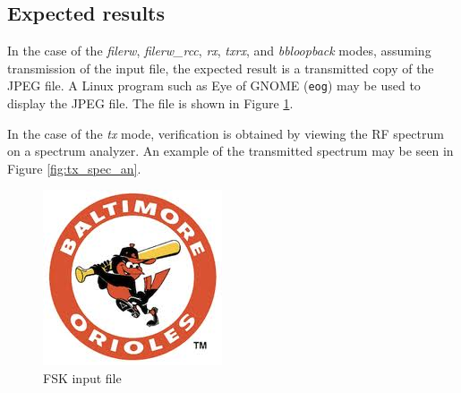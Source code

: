 \subsection{Expected results}
In the case of the \textit{filerw}, \textit{filerw\_rcc}, \textit{rx}, \textit{txrx}, and \textit{bbloopback} modes, assuming transmission of the  input file, the expected result is a transmitted copy of the JPEG file. A Linux program such as Eye of GNOME (\texttt{eog}) may be used to display the JPEG file. The file is shown in Figure \ref{fig:os_pic}.\par\medskip
In the case of the \textit{tx} mode, verification is obtained by viewing the RF spectrum on a spectrum analyzer. An example of the transmitted spectrum may be seen in Figure \ref{fig:tx_spec_an}.\par\medskip
	\begin{figure}[ht]
	 	\centering
	 	\begin{minipage}{.325\textwidth}
			\centering\includegraphics[width=1.0\linewidth]{Os}
			\caption{FSK input file}
			\label{fig:os_pic}
		\end{minipage}
	 	\begin{minipage}{.45\textwidth}

\end{minipage}
\end{figure}
